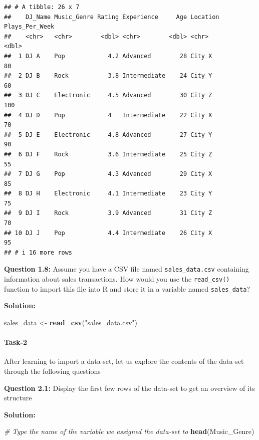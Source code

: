 \documentclass[
]{article}
\newenvironment{Shaded}{\begin{snugshade}}{\end{snugshade}}
\newcommand{\CommentTok}[1]{\textcolor[rgb]{0.56,0.35,0.01}{\textit{#1}}}
\newcommand{\FunctionTok}[1]{\textcolor[rgb]{0.13,0.29,0.53}{\textbf{#1}}}
\newcommand{\NormalTok}[1]{#1}
\newcommand{\OtherTok}[1]{\textcolor[rgb]{0.56,0.35,0.01}{#1}}
\newcommand{\StringTok}[1]{\textcolor[rgb]{0.31,0.60,0.02}{#1}}
\begin{document}
\begin{verbatim}
## # A tibble: 26 x 7
##    DJ_Name Music_Genre Rating Experience     Age Location Plays_Per_Week
##    <chr>   <chr>        <dbl> <chr>        <dbl> <chr>             <dbl>
##  1 DJ A    Pop            4.2 Advanced        28 City X               80
##  2 DJ B    Rock           3.8 Intermediate    24 City Y               60
##  3 DJ C    Electronic     4.5 Advanced        30 City Z              100
##  4 DJ D    Pop            4   Intermediate    22 City X               70
##  5 DJ E    Electronic     4.8 Advanced        27 City Y               90
##  6 DJ F    Rock           3.6 Intermediate    25 City Z               55
##  7 DJ G    Pop            4.3 Advanced        29 City X               85
##  8 DJ H    Electronic     4.1 Intermediate    23 City Y               75
##  9 DJ I    Rock           3.9 Advanced        31 City Z               70
## 10 DJ J    Pop            4.4 Intermediate    26 City X               95
## # i 16 more rows
\end{verbatim}

\textbf{Question 1.8:} Assume you have a CSV file named
\texttt{sales\_data.csv} containing information about sales
transactions. How would you use the \texttt{read\_csv()} function to
import this file into R and store it in a variable named
\texttt{sales\_data}?

\textbf{Solution:}

\begin{Shaded}
\begin{Highlighting}[]
\NormalTok{sales\_data }\OtherTok{\textless{}{-}} \FunctionTok{read\_csv}\NormalTok{(}\StringTok{"sales\_data.csv"}\NormalTok{)}
\end{Highlighting}
\end{Shaded}

\hypertarget{task-2}{%
\paragraph{Task-2}\label{task-2}}

After learning to import a data-set, let us explore the contents of the
data-set through the following questions

\textbf{Question 2.1:} Display the first few rows of the data-set to get
an overview of its structure

\textbf{Solution:}

\begin{Shaded}
\begin{Highlighting}[]
\CommentTok{\# Type the name of the variable we assigned the data{-}set to}
\FunctionTok{head}\NormalTok{(Music\_Genre)}
\end{Highlighting}
\end{Shaded}
\end{document}
